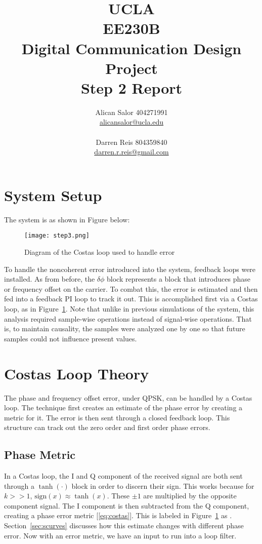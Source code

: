 \documentclass[]{article}
\title{UCLA\\EE230B\\Digital Communication Design Project\\Step 2 Report}
\author{Alican Salor 404271991 \\  \href{mailto:alicansalor@ucla.edu}{alicansalor@ucla.edu} \\ \\
Darren Reis 804359840 \\
\href{mailto:darrer.r.reis@gmail.com}{darren.r.reis@gmail.com} }
\newcommand{\rom}[1]{\uppercase\expandafter{\romannumeral#1}}
\begin{document}
\maketitle

\newpage
\tableofcontents

\newpage


\section{System Setup}
\label{sec:setup}
The system is as shown in Figure below:

\begin{figure}[H]
\centering
\texttt{[image: step3.png]}
\caption{Diagram of the Costas loop used to handle error\label{fig:costas}}
\end{figure}

To handle the noncoherent error introduced into the system, feedback loops were installed.  As from before, the $\delta\phi$ block represents a block that introduces phase or frequency offset on the carrier.  To combat this, the error is estimated and then fed into a feedback PI loop to track it out.  This is accomplished first via a Costas loop, as in Figure~\ref{fig:costas}.  Note that unlike in previous simulations of the system, this analysis required sample-wise operations instead of signal-wise operations.  That is, to maintain causality, the samples were analyzed one by one so that future samples could not influence present values.
\section{Costas Loop Theory}
\label{sec:costas}
The phase and frequency offset error, under QPSK, can be handled by a Costas loop.  The technique first creates an estimate of the phase error by creating a metric for it.  The error is then sent through a closed feedback loop.  This structure can track out the zero order and first order phase errors. 
\subsection{Phase Metric}
\label{sec:phaseMetric} 
In a Costas loop, the I and Q component of the received signal are both sent through a $\tanh\left(\cdot\right)$ block in order to discern their sign.  This works because for $k>>1$, $\text{sign}\left(x\right) \approx \tanh \left(x\right)$.  These $\pm1$ are multiplied by the opposite component signal.  The I component is then subtracted from the Q component, creating a phase error metric [\ref{eq:costas}].  This is labeled in Figure~\ref{fig:costas} as \rom{1}.  Section~\ref{sec:scurves} discusses how this estimate changes with different phase error.  Now with an error metric, we have an input to run into a loop filter. 
\end{document}
